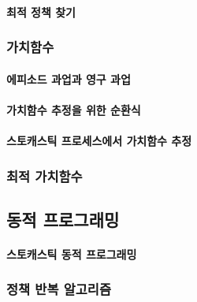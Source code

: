 \documentclass [12pt] {oblivoir}
\let\oldsubsubsection=\subsubsection
\renewcommand{\subsubsection}
{
  \filbreak
  \oldsubsubsection
}
\begin{document}
\vspace{3mm}

\paragraph*{최적 정책 찾기}\mbox{}

\vspace{3mm}

\subsubsection{가치함수}

\paragraph*{에피소드 과업과 영구 과업}\mbox{}

\vspace{3mm}

\paragraph*{가치함수 추정을 위한 순환식}\mbox{}

\vspace{3mm}

\paragraph*{스토캐스틱 프로세스에서 가치함수 추정}\mbox{}

\vspace{3mm}

\subsubsection{최적 가치함수}

\subsection{동적 프로그래밍}

\paragraph*{스토캐스틱 동적 프로그래밍}\mbox{}

\vspace{3mm}

\subsubsection{정책 반복 알고리즘}
\end{document}
